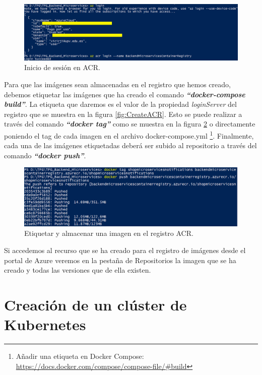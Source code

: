 \documentclass[11pt,spanish,listoffigures]{tfgetsinf}
\begin{document}
\begin{figure}[h]
\centering
\includegraphics[scale=0.50]{LoginAcr}
\caption{Inicio de sesión en ACR.}
\label{fig:LoginAcr}
\end{figure}

Para que las imágenes sean almacenadas en el registro que hemos creado, debemos etiquetar las imágenes que ha creado el comando \textbf{\textit{``docker-compose build''}}. La etiqueta que daremos es el valor de la propiedad \textit{loginServer} del registro que se muestra en la figura \ref{fig:CreateACR}. Esto se puede realizar a través del comando \textit{\textbf{``docker tag''}} como se muestra en la figura \ref{fig:PushImage} o directamente poniendo el tag de cada imagen en el archivo docker-compose.yml \footnote{ Añadir una etiqueta en Docker Compose: \url{https://docs.docker.com/compose/compose-file/\#build}}. Finalmente, cada una de las imágenes etiquetadas deberá ser subido al repositorio a través del comando \textit{\textbf{``docker push''}}.

\begin{figure}[h]
\centering
\includegraphics[scale=0.6]{PushImage}
\caption{Etiquetar y almacenar una imagen en el registro ACR.}
\label{fig:PushImage}
\end{figure}

Si accedemos al recurso que se ha creado para el registro de imágenes desde el portal de Azure veremos en la pestaña de Repositorios la imagen que se ha creado y todas las versiones que de ella existen.

\newpage

\section{Creación de un clúster de Kubernetes} 
\end{document}
